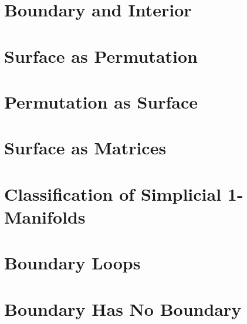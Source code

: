 \section{Boundary and Interior}

\section{Surface as Permutation}

\section{Permutation as Surface}

\section{Surface as Matrices}

\section{Classiﬁcation of Simplicial 1-Manifolds}

\section{Boundary Loops}

\section{Boundary Has No Boundary}

